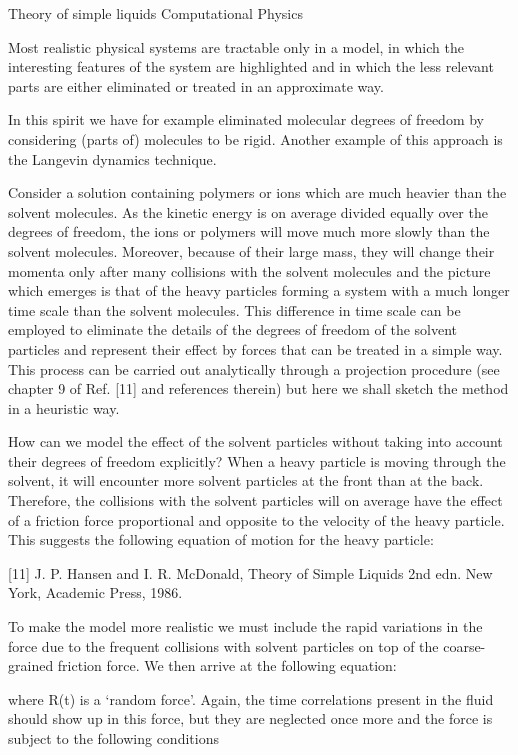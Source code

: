 \documentclass[../../main-notes.tex]{subfiles}
\begin{document}
Theory of simple liquids 
Computational Physics

Most realistic physical systems are tractable only in a model, in which the interesting features of the system are highlighted and in which the less relevant parts are either eliminated or treated in an approximate way. 

In this spirit we have for example eliminated molecular degrees of freedom by considering (parts of) molecules to be rigid. 
Another example of this approach is the Langevin dynamics technique. 

Consider a solution containing polymers or ions which are much heavier than the solvent molecules. 
As the kinetic energy is on average divided equally over the degrees of freedom, the ions or polymers will move much more slowly than the solvent molecules.
Moreover, because of their large mass, they will change their momenta only after many collisions with the solvent molecules and the picture which emerges is that of the heavy particles forming a system with a much longer time scale than the solvent molecules.
This difference in time scale can be employed to eliminate the details of the degrees of freedom of the solvent particles and represent their effect by forces that can be treated in a simple way.
This process can be carried out analytically through a projection procedure (see chapter 9 of Ref. [11] and references therein) but here we shall sketch the method in a heuristic way.

How can we model the effect of the solvent particles without taking into account their degrees of freedom explicitly? 
When a heavy particle is moving through the solvent, it will encounter more solvent particles at the front than at the back. 
Therefore, the collisions with the solvent particles will on average have the effect of a friction force proportional and opposite to the velocity of the heavy particle. 
This suggests the following equation of motion for the heavy particle:

[11] J. P. Hansen and I. R. McDonald, Theory of Simple Liquids 2nd edn. New York, Academic Press, 1986.

To make the model more realistic we must include the rapid variations in the force due to the frequent collisions with solvent particles on top of the coarse-grained friction force. 
We then arrive at the following equation:

where R(t) is a ‘random force’.
Again, the time correlations present in the fluid should show up in this force, but they are neglected once more and the force is subject to the following conditions 
\end{document}
